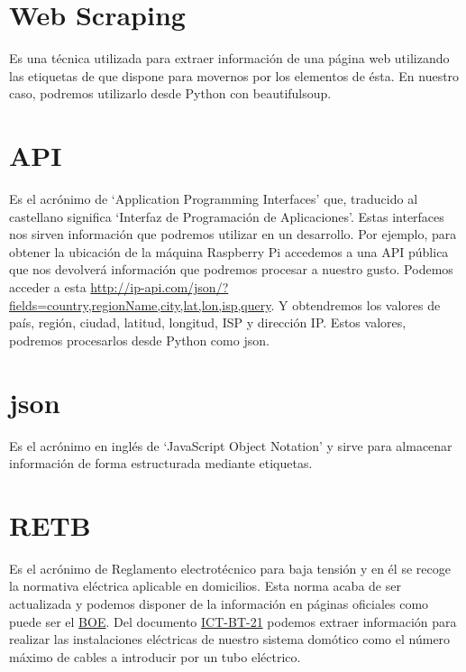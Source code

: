 \section{Web Scraping}
Es una técnica utilizada para extraer información de una página web utilizando las etiquetas de que dispone para movernos por los elementos de ésta.
En nuestro caso, podremos utilizarlo desde Python con beautifulsoup.

\section{API}
Es el acrónimo de ‘Application Programming Interfaces’ que, traducido al castellano significa ‘Interfaz de Programación de Aplicaciones’. Estas interfaces nos sirven información que podremos utilizar en un desarrollo.
Por ejemplo, para obtener la ubicación de la máquina Raspberry Pi accedemos a una API pública que nos devolverá información que podremos procesar a nuestro gusto.
Podemos acceder a esta \href{http://ip-api.com/json/?fields=country,regionName,city,lat,lon,isp,query}{http://ip-api.com/json/?fields=country,regionName,city,lat,lon,isp,query}.
Y obtendremos los valores de país, región, ciudad, latitud, longitud, ISP y dirección IP.
Estos valores, podremos procesarlos desde Python como json.

\section{json}
Es el acrónimo en inglés de ‘JavaScript Object Notation’ y sirve para almacenar información de forma estructurada mediante etiquetas.

\section{RETB}
Es el acrónimo de Reglamento electrotécnico para baja tensión y en él se recoge la normativa eléctrica aplicable en domicilios.
Esta norma acaba de ser actualizada y podemos disponer de la información en páginas oficiales como puede ser el  \href{https://www.boe.es/biblioteca_juridica/codigos/abrir_pdf.php?fich=326_Reglamento_electrotecnico_para_baja_tension_e_ITC.pdf}{BOE}.
Del documento \href{http://eschoform.educarex.es/useruploads/r/c/886/scorm_imported/88234455166233572664/media/guia_bt_21.pdf}{ICT-BT-21} podemos extraer información para realizar las instalaciones eléctricas de nuestro sistema domótico como el número máximo de cables a introducir por un tubo eléctrico.


